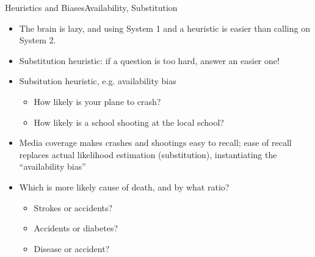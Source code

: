 \documentclass{beamer}
\begin{document}
\begin{frame}{Heuristics and Biases}{Availability, Substitution}
\begin{itemize}
\item The brain is lazy, and using System 1 and a heuristic is easier than calling on System 2.
\item Substitution heuristic: if a question is too hard, answer an easier one!
\item Subsitution heuristic, e.g. availability bias
  \begin{itemize}
  \item How likely is your plane to crash?
  \item How likely is a school shooting at the local school?
  \end{itemize}
\item Media coverage makes crashes and shootings easy to recall; ease of recall replaces actual likelihood estimation (substitution), instantiating the ``availability bias'' 
\item Which is more likely cause of death, and by what ratio? 
  \begin{itemize}
  \item Strokes or accidents?
  \item Accidents or diabetes?
  \item Disease or accident?
  \end{itemize}
\end{itemize}
\end{frame}
\end{document}
